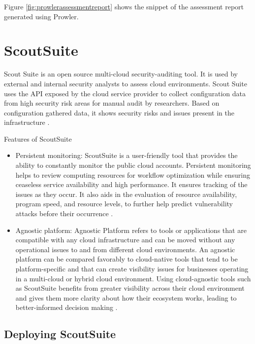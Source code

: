 Figure \ref{fig:prowlerassessmentreport} shows the snippet of the assessment report generated using Prowler.



\section{ScoutSuite}

\par Scout Suite is an open source multi-cloud security-auditing tool.
It is used by external and internal security analysts to assess cloud environments.
Scout Suite  uses the API exposed by the cloud service provider to collect configuration data from high security risk areas for manual audit by researchers.
Based on configuration gathered data, it shows security risks and issues present in the infrastructure \cite{72}.

\par Features of ScoutSuite
\begin{itemize}
    \item Persistent monitoring: ScoutSuite is a user-friendly tool that provides the ability to constantly monitor
    the public cloud accounts.
    Persistent monitoring helps to review computing resources for workflow optimization while ensuring ceaseless service availability and high performance.
    It ensures tracking of the issues as they occur.
    It also aids in the evaluation of resource availability, program speed, and resource levels, to further help predict vulnerability attacks before their occurrence \cite{73}.
\end{itemize}
\begin{itemize}
    \item Agnostic platform: Agnostic Platform refers to tools or applications that are compatible with any cloud
    infrastructure and can be moved without any operational issues to and from different cloud environments.
    An agnostic platform can be compared favorably to cloud-native tools that tend to be platform-specific and that can create visibility issues for businesses operating in a multi-cloud or hybrid cloud environment.
    Using cloud-agnostic tools such as ScoutSuite benefits from greater visibility across their cloud environment and gives them more clarity about how their ecosystem works, leading to better-informed decision making \cite{73}.
\end{itemize}




\subsection{Deploying ScoutSuite}

